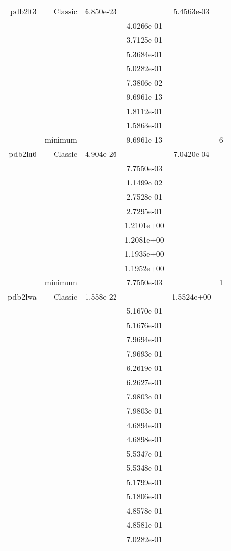 \begin{xltabular}{\textwidth}{r|rS[table-format=1.3e+2]S[table-format=1.4e+2]S[table-format=1.4e+2]S[table-format=-1.5]}
pdb2lt3 & Classic & 6.850e-23 &  & 5.4563e-03 & \\
&  &  & 4.0266e-01 & & \\
&  &  & 3.7125e-01 & & \\
&  &  & 5.3684e-01 & & \\
&  &  & 5.0282e-01 & & \\
&  &  & 7.3806e-02 & & \\
&  &  & 9.6961e-13 & & \\
&  &  & 1.8112e-01 & & \\
&  &  & 1.5863e-01 & & \\
& minimum &  & 9.6961e-13 & & 6 \\  \addlinespace
pdb2lu6 & Classic & 4.904e-26 &  & 7.0420e-04 & \\
&  &  & 7.7550e-03 & & \\
&  &  & 1.1499e-02 & & \\
&  &  & 2.7528e-01 & & \\
&  &  & 2.7295e-01 & & \\
&  &  & 1.2101e+00 & & \\
&  &  & 1.2081e+00 & & \\
&  &  & 1.1935e+00 & & \\
&  &  & 1.1952e+00 & & \\
& minimum &  & 7.7550e-03 & & 1 \\  \addlinespace
pdb2lwa & Classic & 1.558e-22 &  & 1.5524e+00 & \\
&  &  & 5.1670e-01 & & \\
&  &  & 5.1676e-01 & & \\
&  &  & 7.9694e-01 & & \\
&  &  & 7.9693e-01 & & \\
&  &  & 6.2619e-01 & & \\
&  &  & 6.2627e-01 & & \\
&  &  & 7.9803e-01 & & \\
&  &  & 7.9803e-01 & & \\
&  &  & 4.6894e-01 & & \\
&  &  & 4.6898e-01 & & \\
&  &  & 5.5347e-01 & & \\
&  &  & 5.5348e-01 & & \\
&  &  & 5.1799e-01 & & \\
&  &  & 5.1806e-01 & & \\
&  &  & 4.8578e-01 & & \\
&  &  & 4.8581e-01 & & \\
&  &  & 7.0282e-01 & & \\

\end{xltabular}
